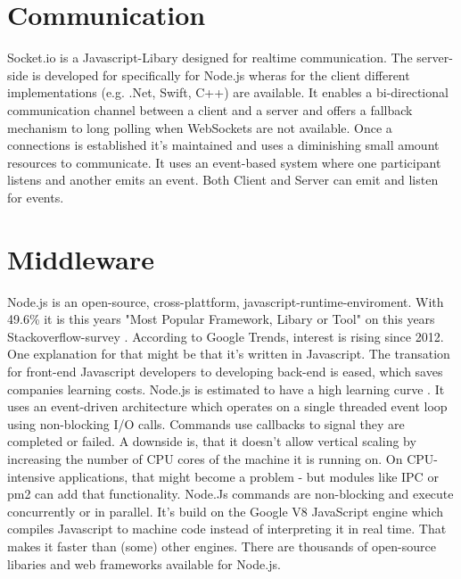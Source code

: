 \section{Communication}
Socket.io is a Javascript-Libary designed for realtime communication. 
The server-side is developed for specifically for Node.js wheras for the client different implementations (e.g. .Net, Swift, C++)\parencite{socketioClients} are available.
It enables a bi-directional communication channel between a client and a server and offers a fallback mechanism to long polling when WebSockets are not available.
Once a connections is established it's maintained and uses a diminishing small amount resources to communicate. 
It uses an event-based system where one participant listens and another emits an event. 
Both Client and Server can emit and listen for events.
\section{Middleware}
Node.js is an open-source, cross-plattform, javascript-runtime-enviroment. 
With 49.6\% it is this years "Most Popular Framework, Libary or Tool" on this years Stackoverflow-survey \parencite{stackOverflowSurvey}.
According to Google Trends, interest is rising since 2012\parencite{gogleTrendNode}.
One explanation for that might be that it's written in Javascript. 
The transation for front-end Javascript developers to developing back-end is eased, which saves companies learning costs.
Node.js is estimated to have a high learning curve \parencite{nodeLearningcurve}.
It uses an event-driven architecture which operates on a single threaded event loop using non-blocking I/O calls.
Commands use callbacks to signal they are completed or failed. 
A downside is, that it doesn't allow vertical scaling by increasing the number of CPU cores of the machine it is running on. 
On CPU-intensive applications, that might become a problem - but modules like IPC or pm2 can add that functionality.
Node.Js commands are non-blocking and execute concurrently or in parallel. 
It's build on the Google V8 JavaScript engine which compiles Javascript to machine code instead of interpreting it in real time. 
That makes it faster than (some) other engines.
There are thousands of open-source libaries and web frameworks available for Node.js. 
